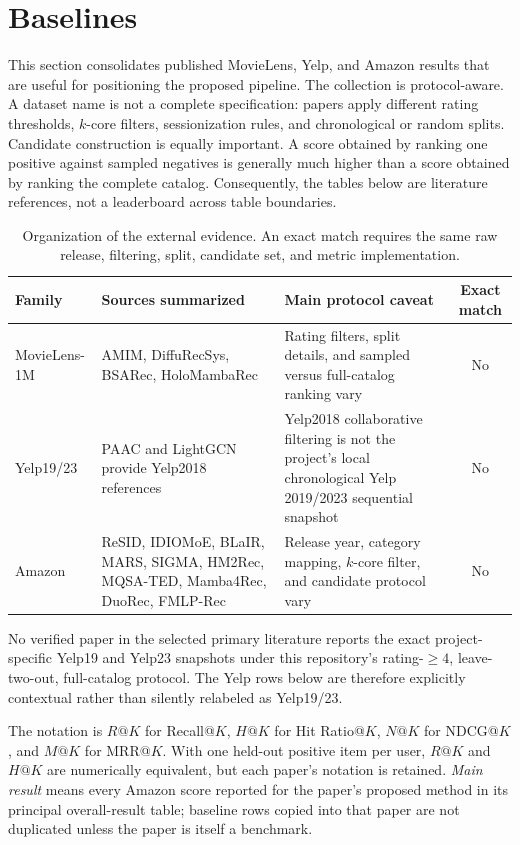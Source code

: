 \section{Baselines}
\label{sec:baselines}

This section consolidates published MovieLens, Yelp, and Amazon results that
are useful for positioning the proposed pipeline. The collection is
protocol-aware. A dataset name is not a complete specification: papers apply
different rating thresholds, $k$-core filters, sessionization rules, and
chronological or random splits. Candidate construction is equally important. A
score obtained by ranking one positive against sampled negatives is generally
much higher than a score obtained by ranking the complete catalog. Consequently,
the tables below are literature references, not a leaderboard across table
boundaries.

\begin{table}[H]
\centering
\caption{Organization of the external evidence. An exact match requires the
same raw release, filtering, split, candidate set, and metric implementation.}
\label{tab:literature-map}
\begin{tabularx}{\textwidth}{@{}p{}p{}Xc@{}}
\toprule
Family & Sources summarized & Main protocol caveat & Exact match\\
\midrule
MovieLens-1M & AMIM, DiffuRecSys, BSARec, HoloMambaRec &
Rating filters, split details, and sampled versus full-catalog ranking vary &
No\\
Yelp19/23 & PAAC and LightGCN provide Yelp2018 references &
Yelp2018 collaborative filtering is not the project's local chronological
Yelp 2019/2023 sequential snapshot & No\\
Amazon & ReSID, IDIOMoE, BLaIR, MARS, SIGMA, HM2Rec, MQSA-TED,
Mamba4Rec, DuoRec, FMLP-Rec & Release year, category mapping, $k$-core
filter, and candidate protocol vary & No\\
\bottomrule
\end{tabularx}
\end{table}

No verified paper in the selected primary literature reports the exact
project-specific Yelp19 and Yelp23 snapshots under this repository's
rating-$\geq4$, leave-two-out, full-catalog protocol. The Yelp rows below are
therefore explicitly contextual rather than silently relabeled as Yelp19/23.

The notation is $R@K$ for Recall@$K$, $H@K$ for Hit Ratio@$K$, $N@K$ for
NDCG@$K$, and $M@K$ for MRR@$K$. With one held-out positive item per user,
$R@K$ and $H@K$ are numerically equivalent, but each paper's notation is
retained. \emph{Main result} means every Amazon score reported for the paper's
proposed method in its principal overall-result table; baseline rows copied
into that paper are not duplicated unless the paper is itself a benchmark.


